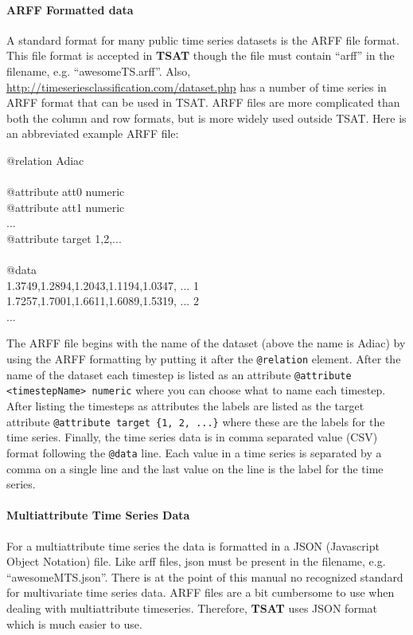 \documentclass[titlepage, letterpaper, 12pt]{article}
\newenvironment{allintypewriter}{\ttfamily}{\par}
\newcommand\TSAT{\textbf{TSAT}}
\begin{document}
\paragraph{ARFF Formatted data}
A standard format for many public time series datasets is the ARFF file format.  This file format is accepted in {\TSAT} though the file must contain ``arff'' in the filename, e.g. ``awesomeTS.arff''.  Also, \url{http://timeseriesclassification.com/dataset.php} has a number of time series in ARFF format that can be used in TSAT.  ARFF files are more complicated than both the column and row formats, but is more widely used outside TSAT.  Here is an abbreviated example ARFF file:\\
\begin{samepage}
\begin{allintypewriter}
	\noindent @relation Adiac\\ \\
	@attribute att0 numeric\\
	@attribute att1 numeric\\
	...\\
	@attribute target {1,2,...}\\ \\
	@data\\
	1.3749,1.2894,1.2043,1.1194,1.0347, ... 1\\
	1.7257,1.7001,1.6611,1.6089,1.5319, ... 2\\
	...
\end{allintypewriter}
\end{samepage}
The ARFF file begins with the name of the dataset (above the name is Adiac) by using the ARFF formatting by putting it after the \texttt{@relation} element. After the name of the dataset each timestep is listed as an attribute \texttt{@attribute <timestepName> numeric} where you can choose what to name each timestep. After listing the timesteps as attributes the labels are listed as the target attribute \texttt{@attribute target \{1, 2, ...\}} where these are the labels for the time series. Finally, the time series data is in comma separated value (CSV) format following the \texttt{@data} line.  Each value in a time series is separated by a comma on a single line and the last value on the line is the label for the time series.

\paragraph{Multiattribute Time Series Data}
For a multiattribute time series the data is formatted in a JSON (Javascript Object Notation) file.  Like arff files, json must be present in the filename, e.g. ``awesomeMTS.json''.  There is at the point of this manual no recognized standard for multivariate time series data.  ARFF files are a bit cumbersome to use when dealing with multiattribute timeseries.  Therefore, {\TSAT} uses JSON format which is much easier to use.  
\end{document}
